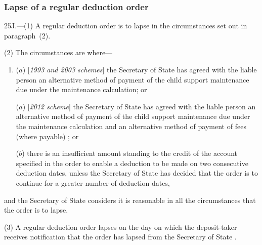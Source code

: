 \documentclass[12pt,a4paper]{article}
\begin{document}

\subsubsection[25J. Lapse of a regular deduction order]{Lapse of a regular deduction order}

25J.---(1)  A regular deduction order is to lapse in the circumstances set out in  paragraph~(2).

(2) The circumstances are where—
\begin{enumerate}\item[]
($a$) [\emph{1993 and 2003 schemes}] the 
Secretary of State  %
has agreed with the liable person an alternative method of payment of the child support maintenance due under the maintenance calculation; or

($a$) [\emph{2012 scheme}] the 
Secretary of State  %
has agreed with the liable person an alternative method of payment of the child support maintenance due under the maintenance calculation
and an alternative method of payment of fees (where payable)%
; or

($b$) there is an insufficient amount standing to the credit of the account specified in the order to enable a deduction to be made on two consecutive deduction dates, unless the 
Secretary of State  %
has decided that the order is to continue for a greater number of deduction dates,
\end{enumerate}
and the 
Secretary of State  %
considers it is reasonable in all the circumstances that the order is to lapse.

(3) A regular deduction order lapses on the day on which the deposit-taker receives notification that the order has lapsed from the 
Secretary of State%
.
\end{document}
